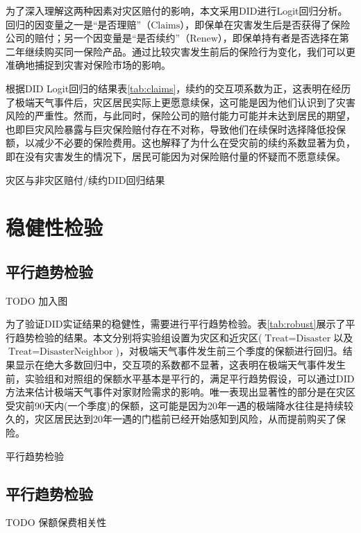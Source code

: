 为了深入理解这两种因素对灾区赔付的影响，本文采用DID进行Logit回归分析。回归的因变量之一是“是否理赔”（$\text{Claims}$），即保单在灾害发生后是否获得了保险公司的赔付；另一个因变量是“是否续约”（$\text{Renew}$），即保单持有者是否选择在第二年继续购买同一保险产品。通过比较灾害发生前后的保险行为变化，我们可以更准确地捕捉到灾害对保险市场的影响。

根据DID Logit回归的结果表\ref{tab:claims}，续约的交互项系数为正，这表明在经历了极端天气事件后，灾区居民实际上更愿意续保，这可能是因为他们认识到了灾害风险的严重性。然而，与此同时，保险公司的赔付能力可能并未达到居民的期望，也即巨灾风险暴露与巨灾保险赔付存在不对称\citep{张旭升2010中国巨灾风险暴露与巨灾保险赔付不对称实证}，导致他们在续保时选择降低投保额，以减少不必要的保险费用。这也解释了为什么在受灾前的续约系数显著为负，即在没有灾害发生的情况下，居民可能因为对保险赔付量的怀疑而不愿意续保。

\begin{table}[htbp]
    \centering
    \caption{灾区与非灾区赔付/续约DID回归结果}\label{tab:claims}
    
\end{table}

\section{稳健性检验}
\subsection{平行趋势检验}
TODO
加入图

为了验证DID实证结果的稳健性，需要进行平行趋势检验。表\ref{tab:robust}展示了平行趋势检验的结果。本文分别将实验组设置为灾区和近灾区($\text{Treat}=\text{Disaster}$以及$\text{Treat}=\text{Disaster}\text{Neighbor}$)，对极端天气事件发生前三个季度的保额进行回归。结果显示在绝大多数回归中，交互项的系数都不显著，这表明在极端天气事件发生前，实验组和对照组的保额水平基本是平行的，满足平行趋势假设，可以通过DID方法来估计极端天气事件对家财险需求的影响。唯一表现出显著性的部分是在灾区受灾前90天内(一个季度)的保额，这可能是因为20年一遇的极端降水往往是持续较久的，灾区居民达到20年一遇的门槛前已经开始感知到风险，从而提前购买了保险。
\begin{table}[htbp]
    \centering
    \caption{平行趋势检验}\label{tab:robust}
    
\end{table}

\subsection{平行趋势检验}
TODO
保额保费相关性
